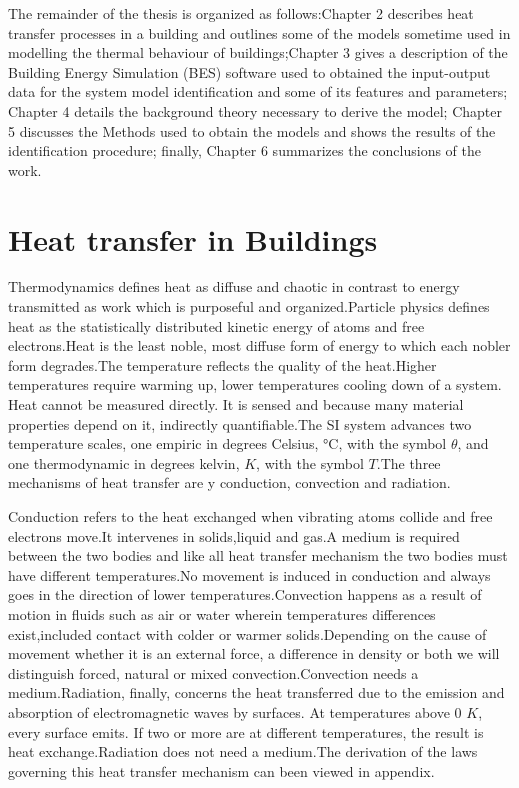 \documentclass[a4paper,12pt]{article}
\numberwithin{equation}{section}
\begin{document}
The remainder of the thesis is organized as follows:Chapter 2 describes heat transfer processes in a building and outlines some of the models sometime used in modelling the thermal behaviour of buildings;Chapter 3 gives a description of the Building Energy Simulation (BES) software used to obtained the input-output data for the system model identification and some of its features and parameters; Chapter 4 details the background  theory necessary to derive the model; Chapter 5 discusses  the Methods used to obtain the models and shows the results of the identification procedure; finally, Chapter 6 summarizes the conclusions of the work. 



\newpage

\section{Heat transfer in Buildings}
Thermodynamics defines heat as diffuse and chaotic in contrast to energy transmitted as work which is purposeful and organized.Particle physics defines heat as the statistically distributed kinetic energy of atoms and free electrons.Heat is the least noble, most diffuse form of energy to which each nobler form degrades.The temperature reflects the quality of the heat.Higher temperatures require warming up, lower temperatures cooling down of a system. Heat cannot be
measured directly. It is sensed and because many material properties depend on it, indirectly quantifiable.The SI system advances two temperature scales, one empiric in degrees Celsius, °C,
with the symbol $\theta$, and one thermodynamic in degrees kelvin, $K$, with the symbol $T$.The three mechanisms of heat transfer are y conduction, convection and radiation.

Conduction refers to the heat exchanged when vibrating atoms collide and free electrons move.It intervenes in solids,liquid and gas.A medium is required between the two bodies and like all heat transfer mechanism the two bodies must have different temperatures.No movement is induced in conduction and always goes in the direction of lower temperatures.Convection happens as a result of motion in  fluids such as air or water wherein temperatures differences exist,included contact with colder or warmer solids.Depending on the cause of movement whether it is an external force, a difference in density or both we will distinguish forced, natural or mixed convection.Convection needs a medium.Radiation, finally, concerns the heat transferred due to the emission and absorption of electromagnetic waves by surfaces. At temperatures above 0 $K$, every surface emits. If two or more are at different temperatures, the result is heat exchange.Radiation does not need a medium.The derivation of the laws governing this heat transfer mechanism can been viewed in appendix.
\end{document}
